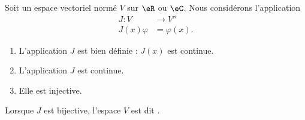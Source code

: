 \begin{propositionDef}      \label{PROPooMAQSooCGFBBM}
    Soit un espace vectoriel normé $V$ sur $\eR$ ou $\eC$. Nous considérons l'application
    \begin{equation}
        \begin{aligned}
            J\colon V&\to V'' \\
            J(x)\varphi&= \varphi(x).
        \end{aligned}
    \end{equation}
    \begin{enumerate}
        \item       \label{ITEMooNVVSooNFXgnE}
            L'application \( J\) est bien définie : \( J(x)\) est continue.
        \item       \label{ITEMooKURHooZZWpbu}
            L'application \( J\) est continue.
        \item       \label{ITEMooTFYVooKhMOjp}
             Elle est injective.
    \end{enumerate}

    Lorsque \( J\) est bijective, l'espace \( V\) est dit .
\end{propositionDef}

